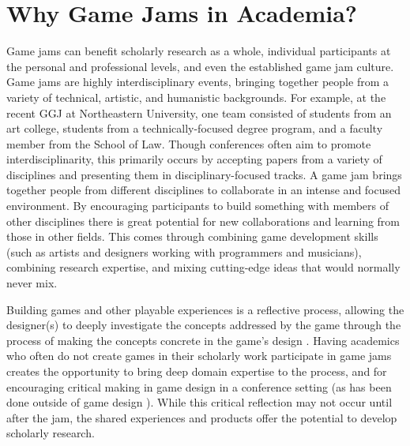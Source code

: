 \documentclass{acm_proc_article-sp}
\newcommand{\mytodo}[1]{\textbf{[[#1]]}}
\begin{document}
\section{Why Game Jams in Academia?}
Game jams can benefit scholarly research as a whole, individual participants at the personal and professional levels, and even the established game jam culture.
Game jams are highly interdisciplinary events, bringing together people from a variety of technical, artistic, and humanistic backgrounds.
For example, at the recent GGJ at Northeastern University, one team consisted of students from an art college, students from a technically-focused degree program, and a faculty member from the School of Law.
Though conferences often aim to promote interdisciplinarity, this primarily occurs by accepting papers from a variety of disciplines and presenting them in disciplinary-focused tracks.
A game jam brings together people from different disciplines to collaborate in an intense and focused environment.
By encouraging participants to build something with members of other disciplines there is great potential for new collaborations and learning from those in other fields.
This comes through combining game development skills (such as artists and designers working with programmers and musicians), combining research expertise, and mixing cutting-edge ideas that would normally never mix.

Building games and other playable experiences is a reflective process, allowing the designer(s) to deeply investigate the concepts addressed by the game through the process of making the concepts concrete in the game's design \cite{mateas2001expressive, schon1983reflective}.
Having academics who often do not create games in their scholarly work participate in game jams creates the opportunity to bring deep domain expertise to the process, and for encouraging critical making in game design in a conference setting (as has been done outside of game design \cite{tanenbaum2014:critical-making}).
While this critical reflection may not occur until after the jam, the shared experiences and products offer the potential to develop scholarly research.
\end{document}
